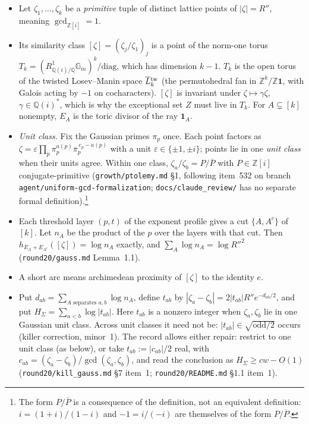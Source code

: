 \documentclass[11pt]{article}
\newcommand{\Z}{\mathbb Z}
\newcommand{\Q}{\mathbb Q}
\newcommand{\GI}{\mathbb Z[i]}
\newcommand{\conj}[1]{\overline{#1}}
\newcommand{\Ltw}[1]{\overline L{}^{\rm tw}_{#1}}
\newcommand{\rec}[1]{\texttt{#1}}
\begin{document}
\begin{itemize}[leftmargin=2em]
  \item Let \(\zeta_1,\dots,\zeta_k\) be a \emph{primitive} tuple of distinct
    lattice points of \(|\zeta|=R''\), meaning \(\gcd_{\GI}=1\).
  \item Its similarity class \([\zeta]=(\zeta_j/\zeta_1)_j\) is a point of the
    norm-one torus
    \(T_k=(R^1_{\Q(i)/\Q}\mathbb G_m)^k/\text{diag}\), which has dimension
    \(k-1\).  \(T_k\) is the open torus of the twisted Losev--Manin space
    \(\Ltw k\) (the permutohedral fan in \(\Z^k/\Z\mathbf 1\), with Galois
    acting by \(-1\) on cocharacters).  \([\zeta]\) is invariant under
    \(\zeta\mapsto\gamma\zeta\), \(\gamma\in\Q(i)^*\), which is why the
    exceptional set \(Z\) must live in \(T_k\).  For \(A\subsetneq[k]\)
    nonempty, \(E_A\) is the toric divisor of the ray \(\mathbf 1_A\).
  \item \emph{Unit class.} Fix the Gaussian primes \(\pi_p\) once.  Each point
    factors as \(\zeta=\varepsilon\prod_p\pi_p^{a(p)}\conj\pi_p^{\,e_p-a(p)}\)
    with a unit \(\varepsilon\in\{\pm1,\pm i\}\); points lie in one \emph{unit
    class} when their units agree.  Within one class,
    \(\zeta_a/\zeta_b=P/\conj P\) with \(P\in\GI\) conjugate-primitive
    (\rec{growth/ptolemy.md} \S1, following item~532 on branch
    \rec{agent/uniform-gcd-formalization}; \rec{docs/claude\_review/} has no
    separate formal definition).\footnote{The form \(P/\conj P\) is a
      consequence of the definition, not an equivalent definition:
      \(i=(1+i)/(1-i)\) and \(-1=i/(-i)\) are themselves of the form
      \(P/\conj P\).}
  \item Each threshold layer \((p,t)\) of the exponent profile gives a cut
    \(\{A,A^c\}\) of \([k]\).  Let \(n_A\) be the product of the \(p\) over the
    layers with that cut.  Then \(h_{E_A+E_{A^c}}([\zeta])=\log n_A\) exactly,
    and \(\sum_A\log n_A=\log R''^2\) (\rec{round20/gauss.md} Lemma~1.1).
  \item A short arc means archimedean proximity of \([\zeta]\) to the identity
    \(e\).
  \item Put \(d_{ab}=\sum_{A\text{ separates }a,b}\log n_A\), define \(t_{ab}\)
    by \(|\zeta_a-\zeta_b|=2|t_{ab}|R''e^{-d_{ab}/2}\), and put
    \(H_\Sigma=\sum_{a<b}\log|t_{ab}|\).  Here \(t_{ab}\) is a nonzero integer
    when \(\zeta_a,\zeta_b\) lie in one Gaussian unit class.  Across unit
    classes it need not be: \(|t_{ab}|\in\sqrt{\text{odd}/2}\) occurs (killer
    correction, minor~1).  The record allows either repair: restrict to one
    unit class (as below), or take \(t_{ab}:=|c_{ab}|/2\) real, with
    \(c_{ab}=(\zeta_a-\zeta_b)/\gcd(\zeta_a,\zeta_b)\), and read the conclusion
    as \(H_\Sigma\ge cw-O(1)\) (\rec{round20/kill\_gauss.md} \S7 item~1;
    \rec{round20/README.md} \S1.1 item~1).
\end{itemize}
\end{document}

